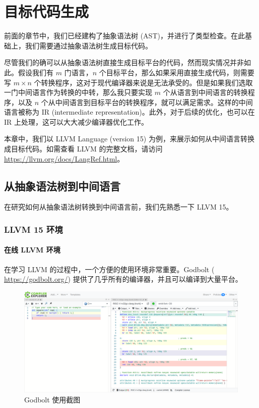 \chapter{目标代码生成}

前面的章节中，我们已经建构了抽象语法树 (AST)，并进行了类型检查。在此基础上，我们需要通过抽象语法树生成目标代码。

尽管我们的确可以从抽象语法树直接生成目标平台的代码，然而现实情况并非如此。假设我们有
$m$ 门语言，$n$ 个目标平台，那么如果采用直接生成代码，则需要写 $m\times n$
个转换程序，这对于现代编译器来说是无法承受的。但是如果我们选取一门中间语言作为转换的中转，那么我只要实现
$m$ 个从语言到中间语言的转换程序，以及 $n$ 个从中间语言到目标平台的转换程序，就可以满足需求。这样的中间语言被称为
IR (intermediate representation)。此外，对于后续的优化，也可以在 IR 上处理，这可以大大减少编译器优化工作。

本章中，我们以 LLVM Language (version 15) 为例，来展示如何从中间语言转换成目标代码。如需查看
LLVM 的完整文档，请访问 \url{https://llvm.org/docs/LangRef.html}。

\section{从抽象语法树到中间语言}

在研究如何从抽象语法树转换到中间语言前，我们先熟悉一下 LLVM 15。

\subsection{LLVM 15 环境}

\subsubsection{在线 LLVM 环境}

在学习 LLVM 的过程中，一个方便的使用环境非常重要。Godbolt (
\url{https://godbolt.org/}) 提供了几乎所有的编译器，并且可以编译到大量平台。

\begin{figure}[htb]
\centering
\includegraphics[scale=0.3]{image/godbolt.png}
\caption{Godbolt 使用截图}
\label{godbolt_sreenshot}
\end{figure}

